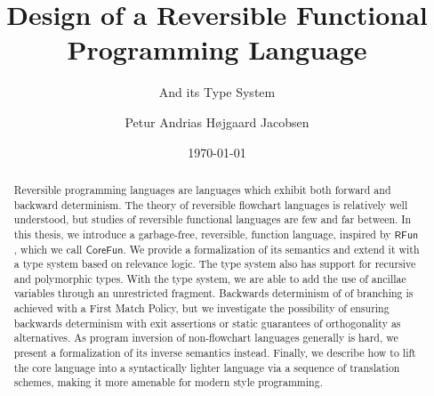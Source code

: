 \documentclass[a4paper,10p,openright]{memoir}
\def\rfunc{\ensuremath{\mathsf{CoreFun}}\xspace}
\def\rfun{\ensuremath{\mathsf{RFun}}\xspace}
\begin{document}

\thesiscomment{} %
\title{Design of a Reversible Functional Programming Language}
\subtitle{And its Type System}
\author{Petur Andrias Højgaard Jacobsen}
\date{\today} %

\pagestyle{plain}
\maketitle

\cleardoublepage
{}
\setcounter{page}{3}

\cleardoublepage
\pagestyle{plain}


\begin{abstract}

  Reversible programming languages are languages which exhibit both forward and
  backward determinism. The theory of reversible flowchart languages is
  relatively well understood, but studies of reversible functional languages
  are few and far between. In this thesis, we introduce a garbage-free,
  reversible, function language, inspired by \rfun, which we call \rfunc. We
  provide a formalization of its semantics and extend it with a type system
  based on relevance logic. The type system also has support for recursive and
  polymorphic types. With the type system, we are able to add the use of
  ancillae variables through an unrestricted fragment. Backwards determinism of
  of branching is achieved with a First Match Policy, but we investigate the
  possibility of ensuring backwards determinism with exit assertions or static
  guarantees of orthogonality as alternatives. As program inversion of
  non-flowchart languages generally is hard, we present a formalization of its
  inverse semantics instead. Finally, we describe how to lift the core language
  into a syntactically lighter language via a sequence of translation schemes,
  making it more amenable for modern style programming.

\end{abstract}
\end{document}

